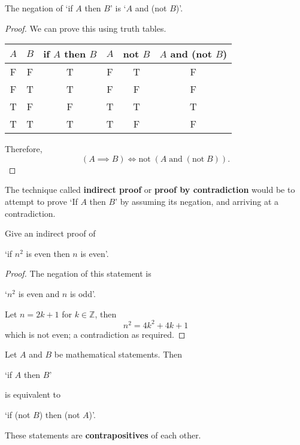 \begin{theorem}
    The negation of `if $A$ then $B$' is `$A$ and (not $B$)'.
\end{theorem}

\begin{proof}
    We can prove this using truth tables.
    \begin{center}
        \begin{tabular}{cccccc}
            \toprule
            $A$ & $B$ & if $A$ then $B$ & $A$ & not $B$ & $A$ and (not $B$) \\
            \midrule
            F & F & T & F & T & F \\
            F & T & T & F & F & F \\
            T & F & F & T & T & T \\
            T & T & T & T & F & F \\
            \bottomrule
        \end{tabular}
    \end{center}
    Therefore, \[(A\implies B)\iff\text{not}\;(A\;\text{and}\;(\text{not}\;B)).\]
\end{proof}

\begin{definition}
    The technique called \textbf{indirect proof} or \textbf{proof by contradiction} would be to attempt to prove `If $A$ then $B$' by assuming its negation, and arriving at a contradiction.
\end{definition}

\begin{example}
    Give an indirect proof of 
    \begin{center}
        `if $n^2$ is even then $n$ is even'.
    \end{center}
    
    \begin{proof}
        The negation of this statement is
        \begin{center}
            `$n^2$ is even and $n$ is odd'.
        \end{center}
        Let $n=2k+1$ for $k\in\mathbb Z$, then \[n^2=4k^2+4k+1\] which is not even; a contradiction as required.
    \end{proof}
\end{example}

\begin{theorem}
    Let $A$ and $B$ be mathematical statements. Then
    \begin{center}
        `if $A$ then $B$'
    \end{center}
    is equivalent to
    \begin{center}
        `if (not $B$) then (not $A$)'.
    \end{center}
    These statements are \textbf{contrapositives} of each other.
\end{theorem}

